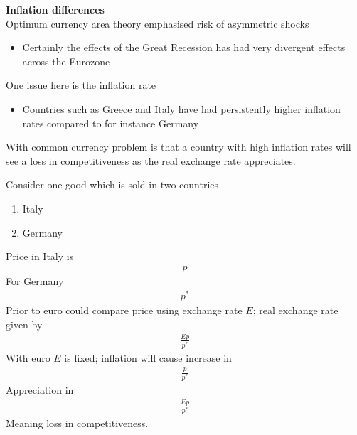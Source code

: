 \documentclass{beamer}
\begin{document}
\begin{frame}
  \textbf{Inflation differences}\\
  Optimum currency area theory emphasised risk of asymmetric shocks
  \begin{itemize}
    \item Certainly the effects of the Great Recession has had very divergent effects across the Eurozone
  \end{itemize}
  \medskip
  One issue here is the inflation rate 
  \begin{itemize}
    \item Countries such as Greece and Italy have had persistently higher inflation rates compared to for instance Germany
  \end{itemize}
  \medskip
  With common currency problem is that a country with high inflation rates will see a loss in competitiveness as the real exchange rate appreciates. 
\end{frame}

\begin{frame}
  Consider one good which is sold in two countries
  \begin{enumerate}
    \item Italy
    \item Germany
  \end{enumerate}
  Price in Italy is
  \begin{align}
    p
  \end{align}
  For Germany
  \begin{align}
    p^*
  \end{align}
  Prior to euro could compare price using exchange rate $E$; real exchange rate given by
  \begin{align}
    \frac{Ep}{p^*}
  \end{align}
	With euro $E$ is fixed; inflation will cause increase in 
	\begin{align}
	  \frac{p}{p^*}
	\end{align}
	Appreciation in 
	\begin{align}
	  \frac{Ep}{p^*}
	\end{align}
	Meaning loss in competitiveness. 
\end{frame}
\end{document}
